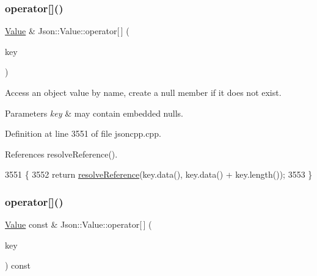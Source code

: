 \subsubsection{\texorpdfstring{operator[]()}{operator[]()}\hspace{0.1cm}{\footnotesize\ttfamily [7/9]}}
{\footnotesize\ttfamily \hyperlink{class_json_1_1_value}{Value} \& Json\+::\+Value\+::operator\mbox{[}$\,$\mbox{]} (\begin{DoxyParamCaption}\item[{const \hyperlink{json_8h_a1e723f95759de062585bc4a8fd3fa4be}{J\+S\+O\+N\+C\+P\+P\+\_\+\+S\+T\+R\+I\+NG} \&}]{key }\end{DoxyParamCaption})}

Access an object value by name, create a null member if it does not exist. 
\begin{DoxyParams}{Parameters}
{\em key} & may contain embedded nulls. \\
\hline
\end{DoxyParams}


Definition at line 3551 of file jsoncpp.\+cpp.



References resolve\+Reference().


\begin{DoxyCode}
3551                                                   \{
3552   \textcolor{keywordflow}{return} \hyperlink{class_json_1_1_value_a9ff9cdae2c8f4155bab603d750b0b3f1}{resolveReference}(key.data(), key.data() + key.length());
3553 \}
\end{DoxyCode}
\mbox{\label{class_json_1_1_value_aba60f69dcd85e935aa85e7a517e03427}} 
\subsubsection{\texorpdfstring{operator[]()}{operator[]()}\hspace{0.1cm}{\footnotesize\ttfamily [8/9]}}
{\footnotesize\ttfamily \hyperlink{class_json_1_1_value}{Value} const  \& Json\+::\+Value\+::operator\mbox{[}$\,$\mbox{]} (\begin{DoxyParamCaption}\item[{const \hyperlink{json_8h_a1e723f95759de062585bc4a8fd3fa4be}{J\+S\+O\+N\+C\+P\+P\+\_\+\+S\+T\+R\+I\+NG} \&}]{key }\end{DoxyParamCaption}) const}

